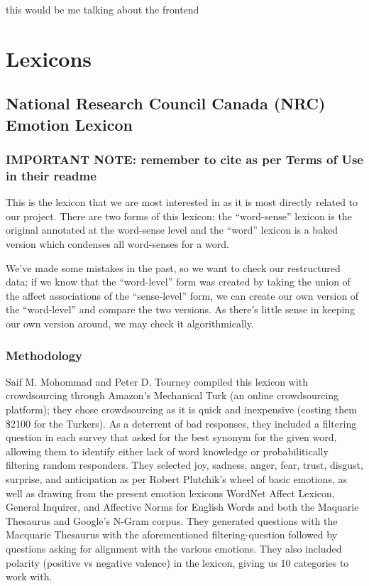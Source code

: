\documentclass[11pt, twoside, reqno]{book}
\begin{document}
this would be me talking about the frontend

\chapter{Lexicons}



\section{National Research Council Canada (NRC) Emotion Lexicon}

\subsection{IMPORTANT NOTE: remember to cite as per Terms of Use in their readme}

This is the lexicon that we are most interested in as it is most directly related to our project. There are two forms of this lexicon: the ``word-sense'' lexicon is the original annotated at the word-sense level and the ``word'' lexicon is a baked version which condenses all word-senses for a word.

We've made some mistakes in the past, so we want to check our restructured data; if we know that the ``word-level'' form was created by taking the union of the affect associations of the ``sense-level'' form, we can create our own version of the ``word-level'' and compare the two versions. As there's little sense in keeping our own version around, we may check it algorithmically.

\subsection{Methodology}

Saif M. Mohommad and Peter D. Tourney compiled this lexicon with crowdsourcing through Amazon's Mechanical Turk (an online crowdsourcing platform); they chose crowdsourcing as it is quick and inexpensive (costing them \$2100 for the Turkers). As a deterrent of bad responses, they included a filtering question in each survey that asked for the best synonym for the given word, allowing them to identify either lack of word knowledge or probabilitically filtering random responders. They selected joy, sadness, anger, fear, trust, disgust, surprise, and anticipation as per Robert Plutchik's wheel of basic emotions, as well as drawing from the present emotion lexicons WordNet Affect Lexicon, General Inquirer, and Affective Norms for English Words and both the Maquarie Thesaurus and Google's N-Gram corpus. They generated questions with the Macquarie Thesaurus with the aforementioned filtering-question followed by questions asking for alignment with the various emotions. They also included polarity (positive vs negative valence) in the lexicon, giving us 10 categories to work with.
\end{document}
